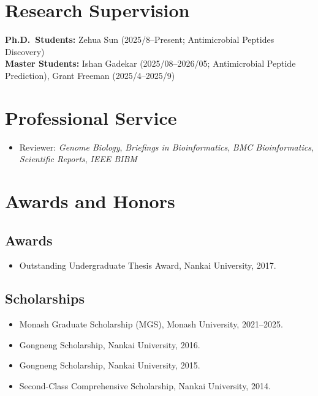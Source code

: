 \documentclass[10pt,a4paper]{article}
\begin{document}
\section{Research Supervision}
\textbf{Ph.D.\ Students:} Zehua Sun (2025/8--Present; Antimicrobial Peptides Discovery) \\
\textbf{Master Students:} Ishan Gadekar (2025/08--2026/05; Antimicrobial Peptide Prediction), Grant Freeman (2025/4--2025/9)

\section{Professional Service}
\begin{itemize}
  \item Reviewer: \textit{Genome Biology}, \textit{Briefings in Bioinformatics}, \textit{BMC Bioinformatics}, \textit{Scientific Reports}, \textit{IEEE BIBM}
\end{itemize}

\section{Awards and Honors}

\subsection*{Awards}
\begin{itemize}
  \item Outstanding Undergraduate Thesis Award, Nankai University, 2017.
\end{itemize}

\subsection*{Scholarships}
\begin{itemize}
  \item Monash Graduate Scholarship (MGS), Monash University, 2021--2025.
  \item Gongneng Scholarship, Nankai University, 2016.
  \item Gongneng Scholarship, Nankai University, 2015.
  \item Second-Class Comprehensive Scholarship, Nankai University, 2014.
\end{itemize}
\end{document}

